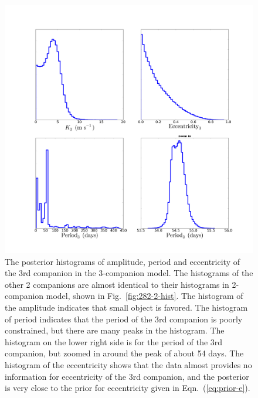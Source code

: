 \documentclass[letterpaper, preprint]{aastex}
\begin{document}
\begin{figure}
 \centering
 \includegraphics[width=0.99\linewidth]{282-3-hist.png}
 \caption{The posterior histograms of amplitude, period and eccentricity of the 3rd companion in the 3-companion model. The histograms of the other 2 companions are almost identical to their histograms in 2-companion model, shown in Fig.~\ref{fig:282-2-hist}. The histogram of the amplitude indicates that small object is favored. The histogram of period indicates that the period of the 3rd companion is poorly constrained, but there are many peaks in the histogram. The histogram on the lower right side is for the period of the 3rd companion, but zoomed in around the peak of about 54 days. The histogram of the eccentricity shows that the data almost provides no information for eccentricity of the 3rd companion, and the posterior is very close to the prior for eccentricity given in Eqn.~(\ref{eq:prior-e}).}
 \label{fig:282-3-hist}
\end{figure}
\end{document}
